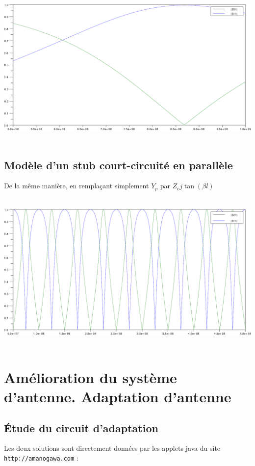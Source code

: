 \documentclass[11pt;a4paper;fleqn]{report}
\begin{document}
\begin{itemize}
    \newpage
    

    \includegraphics[width=\linewidth,height=8cm]{images/1c}

   \end{itemize}
  \newpage
  \section{Modèle d'un stub court-circuité en parallèle}
   De la même manière, en remplaçant simplement $Y_p$ par $Z_c j \tan(\beta l)$

    

    \includegraphics[width=\linewidth,height=8cm]{images/1d}

 \chapter{Amélioration du système d'antenne. Adaptation d'antenne}
  \section{Étude du circuit d'adaptation}
   Les deux solutions sont directement données par les applets java du site \verb|http://amanogawa.com| :
   
\end{document}
